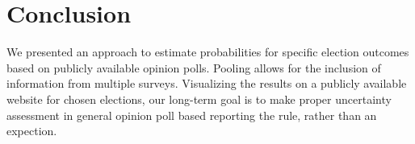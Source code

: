 \documentclass[twoside]{report}
\begin{document}
%
%
%



\section{Conclusion}
We presented an approach to estimate probabilities for specific election outcomes based on publicly available opinion polls. Pooling allows for the inclusion of information from multiple surveys. Visualizing the results on a publicly available website for chosen elections, our long-term goal is to make proper uncertainty assessment
in general opinion poll based reporting the rule, rather than an expection.
\end{document}
